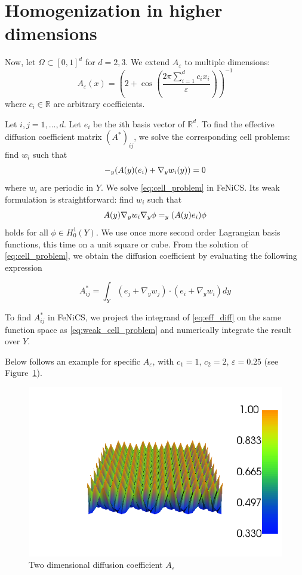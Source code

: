 \documentclass{article}
\renewcommand{\epsilon}{\varepsilon}
\newcommand{\R}{\mathbb{ R}}
\let\div\relax
\DeclareMathOperator{\div}{div}
\begin{document}
\section{Homogenization in higher dimensions}
Now, let $\Omega \subset [0,1]^d$ for $d=2,3$. We extend $A_\epsilon$ to multiple dimensions:
\begin{equation}
    A_\epsilon(x) =  \left( 2+\cos\left(\frac{2\pi \sum_{i=1}^dc_ix_i}{\epsilon}\right) \right)^{-1}
\end{equation}
where $c_i \in \R$ are arbitrary coefficients. 

Let $i,j=1,\dots,d$. Let $e_i$ be the $i$th basis vector of $\R^d$. To find the effective diffusion coefficient matrix $(A^*)_{ij}$, we solve the corresponding cell problems: find $w_i$ such that
\begin{equation}
    \begin{split}
        -\div_y(A(y)(e_i) + \nabla_y w_i(y)) = 0
    \end{split}
    \label{eq:cell_problem}
\end{equation}
where $w_i$ are periodic in $Y$.
We solve \eqref{eq:cell_problem} in FeNiCS. Its weak formulation is straightforward: find $w_i$ such that
\begin{equation}
    A(y)\nabla_y w_i \nabla_y \phi = \div_y(A(y)e_i)\phi
    \label{eq:weak_cell_problem}
\end{equation}
holds for all $\phi \in H^1_0(Y)$. We use once more second order Lagrangian basis functions, this time on a unit square or cube.
From the solution of \eqref{eq:cell_problem}, we obtain the diffusion coefficient by evaluating the following expression

\begin{equation}
    A^*_{ij} = \int_Y(e_j + \nabla_y w_j)\cdot(e_i + \nabla_y w_i)dy
    \label{eq:eff_diff}
\end{equation}

To find $A^*_{ij}$ in FeNiCS, we project the integrand of \eqref{eq:eff_diff} on the same function space as \eqref{eq:weak_cell_problem} and numerically integrate the result over $Y$.

Below follows an example for specific $A_\epsilon$, with $c_1=1$, $c_2=2$, $\epsilon = 0.25$ (see Figure~\ref{fig:two_dim_diff}).

\begin{figure}[h]
    \centering
    \includegraphics[width=0.8\linewidth]{two_dim_diff.png}
    \caption{Two dimensional diffusion coefficient $A_\epsilon$}
    \label{fig:two_dim_diff}
\end{figure}
\end{document}
